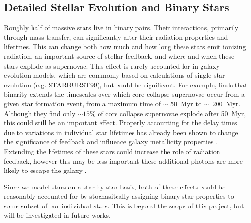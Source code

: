\documentclass[twocolumn]{aastex61}
\begin{document}
\subsection{Detailed Stellar Evolution and Binary Stars}


Roughly half of massive stars live in binary pairs. Their interactions, primarily through mass transfer, can significantly alter their radiation properties and lifetimes. This can change both how much and how long these stars emit ionizing radiation, an important source of stellar feedback, and where and when these stars explode as supernovae. This effect is rarely accounted for in galaxy evolution models, which are commonly based on calculations of single star evolution (e.g. STARBURST99), but could be significant. For example, \cite{Zapartas2017} finds that binarity extends the timescales over which core collapse supernovae occur from a given star formation event, from a maximum time of $\sim$ 50~Myr to $\sim$~200~Myr. Although they find only $\sim 15\%$ of core collapse supernovae explode after 50~Myr, this could still be an important effect. Properly accounting for the delay times due to variations in individual star lifetimes has already been shown to change the significance of feedback and influence galaxy metallicity properties \citep{Kimm2015}. Extending the lifetimes of these stars could increase the role of radiation feedback, however this may be less important these additional photons are more likely to escape the galaxy \citep[e.g.][]{Ma2016-binary}. 

Since we model stars on a star-by-star basis, both of these effects could be reasonably accounted for by stochasitcally assigning binary star properties to some subset of our individual stars. This is beyond the scope of this project, but will be investigated in future works.
\end{document}
